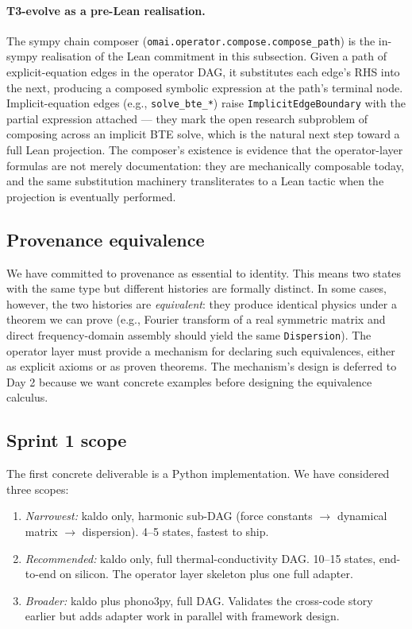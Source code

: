 \documentclass[11pt,a4paper]{article}
\begin{document}
\paragraph{T3-evolve as a pre-Lean realisation.} The sympy chain composer
(\texttt{omai.operator.compose.compose\_path}) is the in-sympy realisation of the
Lean commitment in this subsection. Given a path of explicit-equation edges in the
operator DAG, it substitutes each edge's RHS into the next, producing a composed
symbolic expression at the path's terminal node. Implicit-equation edges (e.g.,
\texttt{solve\_bte\_*}) raise \texttt{ImplicitEdgeBoundary} with the partial
expression attached --- they mark the open research subproblem of composing across
an implicit BTE solve, which is the natural next step toward a full Lean
projection. The composer's existence is evidence that the operator-layer formulas
are not merely documentation: they are mechanically composable today, and the same
substitution machinery transliterates to a Lean tactic when the projection is
eventually performed.

\subsection{Provenance equivalence}

We have committed to provenance as essential to identity. This means two states with the same
type but different histories are formally distinct. In some cases, however, the two histories are
\emph{equivalent}: they produce identical physics under a theorem we can prove (e.g., Fourier
transform of a real symmetric matrix and direct frequency-domain assembly should yield the same
\texttt{Dispersion}). The operator layer must provide a mechanism for declaring such equivalences,
either as explicit axioms or as proven theorems. The mechanism's design is deferred to Day 2
because we want concrete examples before designing the equivalence calculus.

\subsection{Sprint 1 scope}

The first concrete deliverable is a Python implementation. We have considered three scopes:

\begin{enumerate}[leftmargin=2em]
  \item \emph{Narrowest:} kaldo only, harmonic sub-DAG (force constants $\to$ dynamical matrix
        $\to$ dispersion). 4--5 states, fastest to ship.
  \item \emph{Recommended:} kaldo only, full thermal-conductivity DAG. 10--15 states, end-to-end
        on silicon. The operator layer skeleton plus one full adapter.
  \item \emph{Broader:} kaldo plus phono3py, full DAG. Validates the cross-code story earlier but
        adds adapter work in parallel with framework design.
\end{enumerate}
\end{document}

